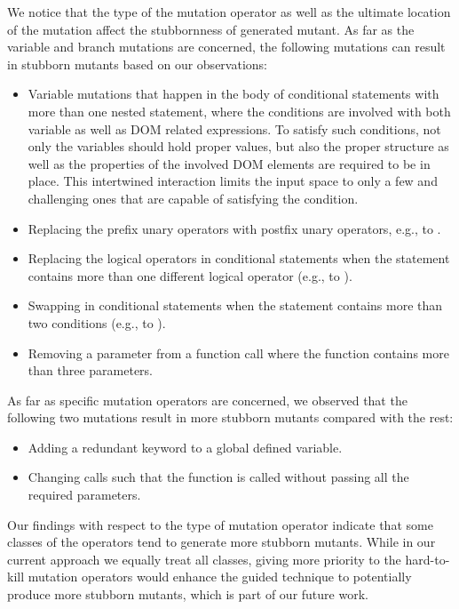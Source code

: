 We notice that the type of the mutation operator as well as the ultimate location of the mutation affect the stubbornness of generated mutant. As far as the variable and branch mutations are concerned, the following mutations can result in stubborn mutants based on our observations:  %
\begin{itemize}
\item Variable mutations that happen in the body of conditional statements with more than one nested statement, where the conditions are involved with both variable as well as DOM related expressions. To satisfy such conditions, not only the variables should hold proper values, but also the proper structure as well as the properties of the involved DOM elements are required to be in place. This intertwined interaction limits the input space to only a few and challenging ones that are capable of satisfying the condition.  
\item Replacing the prefix unary operators with postfix unary operators, e.g.,  to .
\item Replacing the logical operators in conditional statements when the statement contains more than one different logical operator (e.g.,  to ).
\item Swapping  in conditional statements when the statement contains more than two conditions (e.g.,  to ).
\item Removing a parameter from a function call where the function contains more than three parameters.
\end{itemize}

As far as \javascript specific mutation operators are concerned, we observed that the following two mutations result in more stubborn mutants compared with the rest:

\begin{itemize}
\item Adding a redundant  keyword to a global defined variable.
\item Changing  calls such that the function is called without passing all the required parameters.
\end{itemize}
Our findings with respect to the type of mutation operator indicate that some classes of the operators tend to generate more stubborn mutants. While in our current approach we equally treat all classes, giving more priority to the hard-to-kill mutation operators would enhance the guided technique to potentially produce more stubborn mutants, which is part of our future work. 

